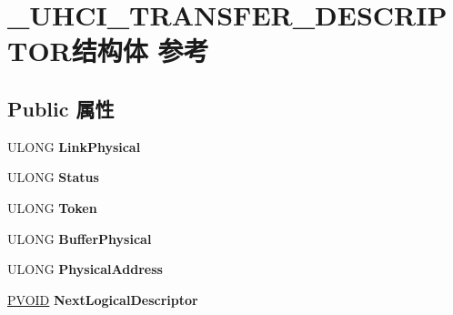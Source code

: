 \hypertarget{struct___u_h_c_i___t_r_a_n_s_f_e_r___d_e_s_c_r_i_p_t_o_r}{}\section{\+\_\+\+U\+H\+C\+I\+\_\+\+T\+R\+A\+N\+S\+F\+E\+R\+\_\+\+D\+E\+S\+C\+R\+I\+P\+T\+O\+R结构体 参考}
\label{struct___u_h_c_i___t_r_a_n_s_f_e_r___d_e_s_c_r_i_p_t_o_r}
\subsection*{Public 属性}
\begin{DoxyCompactItemize}
\item 
\mbox{\label{struct___u_h_c_i___t_r_a_n_s_f_e_r___d_e_s_c_r_i_p_t_o_r_afedc5499aed0a9519bea5be8a6fd8492}} 
U\+L\+O\+NG {\bfseries Link\+Physical}
\item 
\mbox{\label{struct___u_h_c_i___t_r_a_n_s_f_e_r___d_e_s_c_r_i_p_t_o_r_a8387ee30745c20abe99c646e80714e9b}} 
U\+L\+O\+NG {\bfseries Status}
\item 
\mbox{\label{struct___u_h_c_i___t_r_a_n_s_f_e_r___d_e_s_c_r_i_p_t_o_r_a7231a06fa89504e3c72117672ca9a857}} 
U\+L\+O\+NG {\bfseries Token}
\item 
\mbox{\label{struct___u_h_c_i___t_r_a_n_s_f_e_r___d_e_s_c_r_i_p_t_o_r_a5cc53a762e616e76b5631060596fbb33}} 
U\+L\+O\+NG {\bfseries Buffer\+Physical}
\item 
\mbox{\label{struct___u_h_c_i___t_r_a_n_s_f_e_r___d_e_s_c_r_i_p_t_o_r_a3ff1c610faa4fc6396f2b3a22d461979}} 
U\+L\+O\+NG {\bfseries Physical\+Address}
\item 
\mbox{\label{struct___u_h_c_i___t_r_a_n_s_f_e_r___d_e_s_c_r_i_p_t_o_r_ac5e4f4ee93fb7df691238732a6fd7b22}} 
\hyperlink{interfacevoid}{P\+V\+O\+ID} {\bfseries Next\+Logical\+Descriptor}

\end{DoxyCompactItemize}
